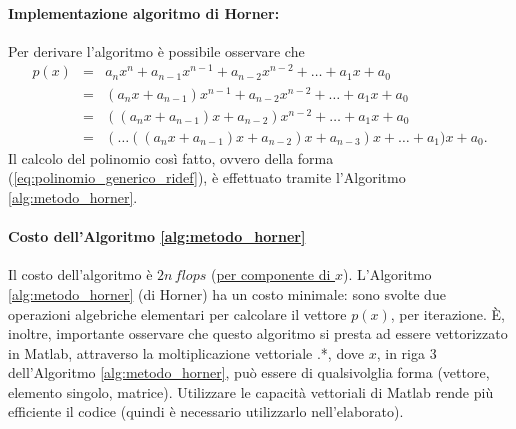 \paragraph{Implementazione algoritmo di Horner:}  Per derivare l'algoritmo è possibile osservare che
\begin{equation*}
	\begin{matrix}
		p(x) &=& a_n x^n + a_{n-1} x^{n-1} + a_{n-2} x^{n-2} + \hdots + a_1 x + a_0\\
				&=& (a_n x + a_{n-1}) x^{n-1} + a_{n-2} x^{n-2} + \hdots + a_1 x + a_0\\
				&=& ((a_n x + a_{n-1})x + a_{n-2})x^{n-2} + \hdots + a_1 x + a_0\\
				&=& (\hdots ((a_n x + a_{n-1})x + a_{n-2})x + a_{n-3}) x + \hdots + a_1 ) x + a_0.
	\end{matrix}
\end{equation*}
Il calcolo del polinomio così fatto, ovvero della forma (\ref{eq:polinomio_generico_ridef}), è effettuato tramite l'Algoritmo \ref{alg:metodo_horner}.

\paragraph{Costo dell'Algoritmo \ref{alg:metodo_horner}} Il costo dell'algoritmo è $2n\, flops$ (\underline{per componente di $x$}). L'Algoritmo \ref{alg:metodo_horner} (di Horner) ha un costo minimale: sono svolte due operazioni algebriche elementari per calcolare il vettore $p(x)$, per iterazione. È, inoltre, importante osservare che questo algoritmo si presta ad essere vettorizzato in Matlab, attraverso la moltiplicazione vettoriale .*, dove $x$, in riga 3 dell'Algoritmo \ref{alg:metodo_horner}, può essere di qualsivolglia forma (vettore, elemento singolo, matrice). Utilizzare le capacità vettoriali di Matlab rende più efficiente il codice (quindi è necessario utilizzarlo nell'elaborato).


